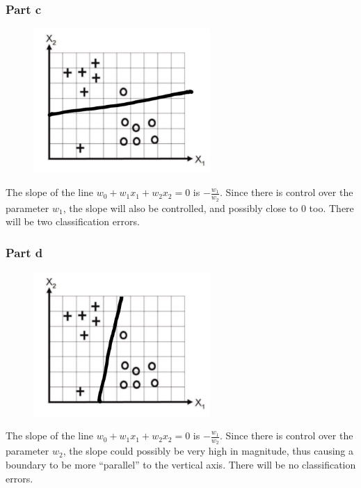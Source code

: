 \documentclass{article}
\begin{document}
\subsubsection*{Part c}
\begin{minipage}{0.475\linewidth}
\begin{figure}[H]
\centering
\includegraphics[width=0.6\textwidth]{./images/8_7_c.jpg}
\end{figure}
\end{minipage}
\hfill
\begin{minipage}{0.475\linewidth}
The slope of the line \(w_{0} + w_{1}x_{1} + w_{2}x_{2} = 0\) is \(-\frac{w_{1}}{w_{2}}\). Since there is control over the parameter \(w_{1}\), the slope will also be controlled, and possibly close to \(0\) too. There will be two classification errors.
\end{minipage}

\subsubsection*{Part d}
\begin{minipage}{0.475\linewidth}
\begin{figure}[H]
\centering
\includegraphics[width=0.6\textwidth]{./images/8_7_d.jpg}
\end{figure}
\end{minipage}
\hfill
\begin{minipage}{0.475\linewidth}
The slope of the line \(w_{0} + w_{1}x_{1} + w_{2}x_{2} = 0\) is \(-\frac{w_{1}}{w_{2}}\). Since there is control over the parameter \(w_{2}\), the slope could possibly be very high in magnitude, thus causing a boundary to be more ``parallel'' to the vertical axis. There will be no classification errors.
\end{minipage}
\end{document}

